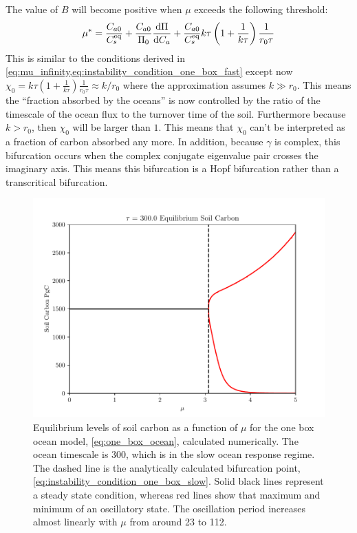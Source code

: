 The value of $B$ will become positive when $\mu$ exceeds the following threshold:
\begin{equation}
  \label{eq:instability_condition_one_box_slow}
  \mu^* =\frac{C_{a0}}{C_s^{\mathrm{eq}}} + \frac{C_{a0}}{\Pi_0} \dv{\Pi}{C_a} + \frac{C_{a0}}{C_s^{\mathrm{eq}}} k\tau\left(
     1 + \frac{1}{k\tau}
  \right) \frac{1}{r_0\tau}
\end{equation}
This is similar to the conditions derived in \cref{eq:mu_infinity,eq:instability_condition_one_box_fast} except now $\chi_0 = k\tau\left(1 + \frac{1}{k\tau} \right) \frac{1}{r_0\tau} \approx k/r_0$
where the approximation assumes $k \gg r_0$. This means the ``fraction absorbed by the oceans'' is now controlled by the ratio of the timescale of the ocean flux to the turnover time of the soil.
Furthermore because $k > r_0$, then $\chi_0$ will be larger than $1$. This means that $\chi_0$ can't be interpreted as a fraction of carbon absorbed any more.
In addition, because $\gamma$ is complex, this bifurcation occurs when the complex conjugate eigenvalue pair crosses the imaginary axis. This means this bifurcation is
a Hopf bifurcation rather than a transcritical bifurcation.
\begin{figure}
  \centering
  \includegraphics[keepaspectratio,width=\textwidth]{one_box_model_soil_carbon_equilibrium_tau_300.0}
  \caption[One box soil carbon equilibrium]{Equilibrium levels of soil carbon as a function of $\mu$ for the one box ocean model, \cref{eq:one_box_ocean},
    calculated numerically. The ocean timescale is \SI{300}{\year}, which is in the slow ocean response regime.
    The dashed line is the analytically calculated bifurcation point, \cref{eq:instability_condition_one_box_slow}.
    Solid black lines represent a steady state condition, whereas red lines show that maximum and minimum of an oscillatory state. The oscillation period increases almost
    linearly with $\mu$ from around \SI{23}{\year} to \SI{112}{\year}. }
  \label{fig:slow_response_bf_diagram}
\end{figure}
